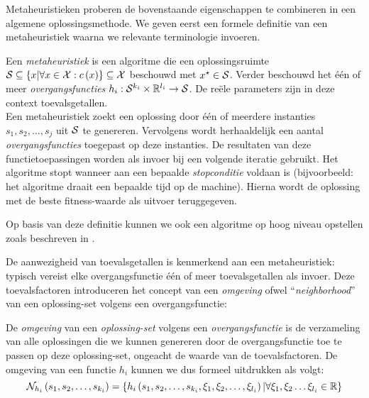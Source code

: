 Metaheuristieken proberen de bovenstaande eigenschappen te combineren in een algemene oplossingsmethode. We geven eerst een formele definitie van een metaheuristiek waarna we relevante terminologie invoeren.

\begin{definition}[Metaheuristiek]
Een \emph{metaheuristiek} is een algoritme die een oplossingsruimte $\mathcal{S}\subseteq\left\{ x|\forall x\in \mathcal{X}:c\left(x\right)\right\}\subseteq\mathcal{X}$ beschouwd met $x^{\star}\in\mathcal{S}$. Verder beschouwd het \'e\'en of meer \emph{overgangsfuncties} $h_i:\mathcal{S}^{k_i}\times\mathbb{R}^{l_i}\rightarrow\mathcal{S}$. De re\"ele parameters zijn in deze context toevalsgetallen.\\
Een metaheuristiek zoekt een oplossing door \'e\'en of meerdere instanties $s_1,s_2,\ldots,s_j$ uit $\mathcal{S}$ te genereren. Vervolgens wordt herhaaldelijk een aantal \emph{overgangsfuncties} toegepast op deze instanties. De resultaten van deze functietoepassingen worden als invoer bij een volgende iteratie gebruikt. Het algoritme stopt wanneer aan een bepaalde \emph{stopconditie} voldaan is (bijvoorbeeld: het algoritme draait een bepaalde tijd op de machine). Hierna wordt de oplossing met de beste fitness-waarde als uitvoer teruggegeven.
\end{definition}

Op basis van deze definitie kunnen we ook een algoritme op hoog niveau opstellen zoals beschreven in .


De aanwezigheid van toevalsgetallen is kenmerkend aan een metaheuristiek: typisch vereist elke overgangsfunctie \'e\'en of meer toevalsgetallen als invoer. Deze toevalsfactoren introduceren het concept van een \emph{omgeving} ofwel ``\emph{neighborhood}'' van een oplossing-set volgens een overgangsfunctie:

\begin{definition}
De \emph{omgeving} van een \emph{oplossing-set} volgens een \emph{overgangsfunctie} is de verzameling van alle oplossingen die we kunnen genereren door de overgangsfunctie toe te passen op deze oplossing-set, ongeacht de waarde van de toevalsfactoren. De omgeving van een functie $h_i$ kunnen we dus formeel uitdrukken als volgt:
\begin{equation}
\mathcal{N}_{h_i}\left(s_1,s_2,\ldots,s_{k_i}\right)=\left\{ h_i\left(s_1,s_2,\ldots,s_{k_i},\xi_1,\xi_2,\ldots,\xi_{l_i}\right)|\forall \xi_1,\xi_2\ldots \xi_{l_i}\in\mathbb{R}\right\}
\end{equation}
\end{definition}

